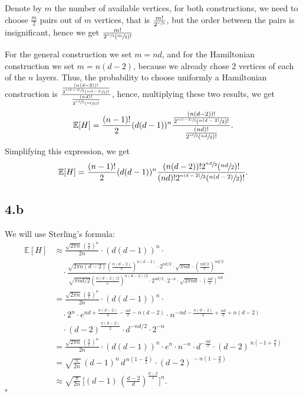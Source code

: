 \documentclass{article}
\begin{document}
Denote by $m$ the number of available vertices, for both constructions, we need to choose $\frac{m}{2}$ pairs out of $m$ vertices, that is $\frac{m!}{2^{\sfrac{m}{2}}}$, but the order between the pairs is insignificant, hence we get $\frac{m!}{2^{\sfrac{m}{2}}(\sfrac{m}{2})!}$

For the general construction we set $m=nd$, and for the Hamiltonian construction we set $m=n(d-2)$, because we already chose $2$ vertices of each of the $n$ layers. Thus, the probability to choose uniformly a Hamiltonian construction is $\frac{\frac{(n(d-2))!}{2^{\sfrac{n(d-2)}{2}}(\sfrac{n(d-2)}{2})!}}{\frac{(nd)!}{2^{\sfrac{nd}{2}}(\sfrac{nd}{2})!}}$, hence, multiplying these two results, we get \[
\mathbb{E}[H]=\frac{(n-1)!}{2}(d(d-1))^n\frac{\frac{(n(d-2))!}{2^{\sfrac{n(d-2)}{2}}(\sfrac{n(d-2)}{2})!}}{\frac{(nd)!}{2^{\sfrac{nd}{2}}(\sfrac{nd}{2})!}}
.\]
Simplifying this expression, we get
\[
\mathbb{E}[H]=\frac{(n-1)!}{2}(d(d-1))^n\frac{(n(d-2))!2^{\sfrac{nd}{2}}(\sfrac{nd}{2})!}{(nd)!2^{\sfrac{n(d-2)}{2}}(\sfrac{n(d-2)}{2})!}
.\]
\subsection*{4.b}
We will use Sterling's formula:
\begin{align*}
\mathbb{E}[H] 
&\approx \frac{\sqrt{2\pi n}\,\left(\tfrac{n}{e}\right)^n}{2n}
    \cdot (d(d-1))^n \cdot \\[6pt]
&\quad \cdot
    \frac{\sqrt{2\pi n(d-2)}\left(\tfrac{n(d-2)}{e}\right)^{n(d-2)} \cdot 2^{nd/2}\cdot\sqrt{\pi nd}\cdot\left(\tfrac{nd/2}{e}\right)^{nd/2}}
         {\sqrt{\pi nd/2}\left(\tfrac{n(d-2)/2}{e}\right)^{n(d-2)/2} \cdot 2^{nd/2}\cdot2^{-n}\cdot\sqrt{2\pi nd}\cdot\left(\tfrac{nd}{e}\right)^{nd}} \\[6pt]
&= \frac{\sqrt{2\pi n}\,\left(\tfrac{n}{e}\right)^n}{2n} \cdot (d(d-1))^n \cdot \\[6pt]
&\quad \cdot 2^n \cdot e^{nd + \tfrac{n(d-2)}{2} - \tfrac{nd}{2} - n(d-2)} \cdot
   n^{-nd - \tfrac{n(d-2)}{2} + \tfrac{nd}{2} + n(d-2)} \\
&\quad \cdot (d-2)^{\tfrac{n(d-2)}{2}} \cdot d^{-nd/2}\cdot 2^{-n} \\[6pt]
&= \frac{\sqrt{2\pi n}\,\left(\tfrac{n}{e}\right)^n}{2n} \cdot (d(d-1))^n\cdot e^n \cdot n^{-n}
    \cdot d^{-\tfrac{nd}{2}} \cdot (d-2)^{\,n(-1+\tfrac{d}{2})} \\[6pt]
&= \sqrt{\frac{\pi}{2n}} \,(d-1)^n \, d^{\,n(1-\tfrac{d}{2})} \cdot (d-2)^{\,-n(1-\tfrac{d}{2})} \\[6pt]
&\approx \sqrt{\frac{\pi}{2n}} \,\Big[(d-1)\,\left(\tfrac{d-2}{d}\right)^{\tfrac{d-2}{2}}\Big]^n.
\end{align*} \hfill $\square$
\end{document}
